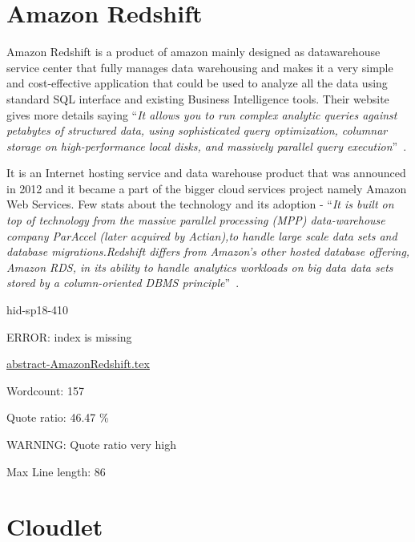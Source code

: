 \section{Amazon Redshift}

Amazon Redshift is a product of amazon mainly designed as
datawarehouse service center that fully manages data warehousing and
makes it a very simple and cost-effective application that could be
used to analyze all the data using standard SQL interface and existing
Business Intelligence tools.  Their website gives more details saying
\color{blue}``\emph{It allows you to run complex analytic queries against petabytes of
structured data, using sophisticated query optimization, columnar
storage on high-performance local disks, and massively parallel query
execution}''\color{black}~\cite{hid-sp18-410-Amazon-Redshift}.

It is an Internet hosting service and data warehouse product that was
announced in 2012 and it became a part of the bigger cloud services
project namely Amazon Web Services. Few stats about the technology and
its adoption - \color{blue}``\emph{It is built on top of technology from the massive
parallel processing (MPP) data-warehouse company ParAccel (later
acquired by Actian),to handle large scale data sets and database
migrations.Redshift differs from Amazon's other hosted database
offering, Amazon RDS, in its ability to handle analytics workloads on
big data data sets stored by a column-oriented DBMS
principle}''\color{black}~\cite{hid-sp18-410-AmazonWiki}.



\begin{IU}

hid-sp18-410

ERROR: index is missing

\href{https://github.com/cloudmesh-community/hid-sp18-410/blob/master//technology/abstract-AmazonRedshift.tex}{abstract-AmazonRedshift.tex}

 

Wordcount: 157


Quote ratio: 46.47 \%

WARNING: Quote ratio very high
 
Max Line length: 86
\end{IU}

\section{Cloudlet}


